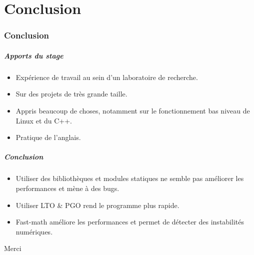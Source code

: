 \documentclass{beamer}
\begin{document}
\part{Conclusion}
\section*{Conclusion}

\begin{frame}[fragile]
    \frametitle{Apports du stage}

    \begin{itemize}
        \item Expérience de travail au sein d'un laboratoire de recherche.
        \item Sur des projets de très grande taille.
        \item Appris beaucoup de choses, notamment sur le fonctionnement bas niveau de Linux et du C++.
        \item Pratique de l'anglais.
    \end{itemize}
\end{frame}

\begin{frame}[fragile]
    \frametitle{Conclusion}

    \begin{itemize}
        \item Utiliser des bibliothèques et modules statiques ne semble pas améliorer les performances et mène à des bugs.
        \item Utiliser LTO \& PGO rend le programme plus rapide.
        \item Fast-math améliore les performances et permet de détecter des instabilités numériques.
    \end{itemize}
\end{frame}

\begin{frame}[fragile]
    \begin{Huge}
        \centerline{Merci}
    \end{Huge}
\end{frame}


\appendix
\end{document}
